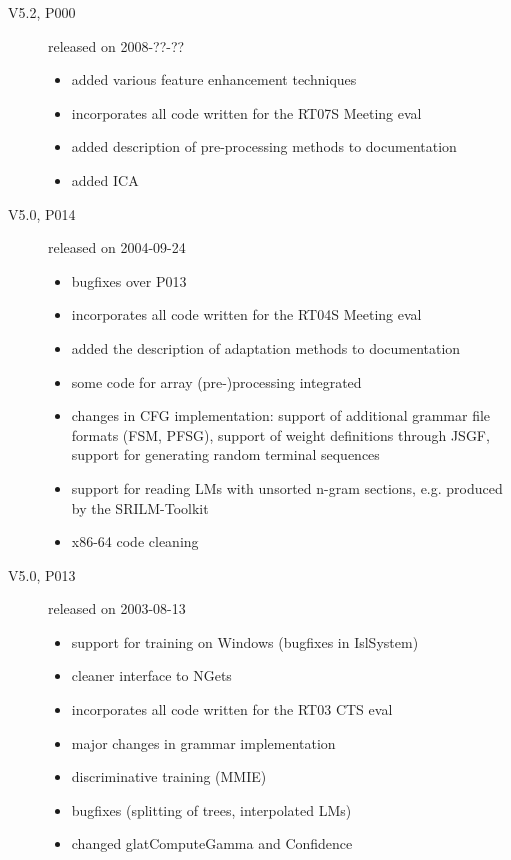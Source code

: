 \documentclass[a4paper,twoside]{book}
\begin{document}
\begin{description}

\item[V5.2, P000] released on 2008-??-??

  \begin{itemize}
  \item added various feature enhancement techniques 
  \item incorporates all code written for the RT07S Meeting eval
  \item added description of pre-processing methods to documentation
  \item added ICA
  \end{itemize}

\item[V5.0, P014] released on 2004-09-24

  \begin{itemize}
  \item bugfixes over P013
  \item incorporates all code written for the RT04S Meeting eval
  \item added the description of adaptation methods to documentation
  \item some code for array (pre-)processing integrated
  \item changes in CFG implementation: support of additional grammar
    file formats (FSM, PFSG), support of weight definitions through
    JSGF, support for generating random terminal sequences
  \item support for reading LMs with unsorted n-gram sections, e.g.
    produced by the SRILM-Toolkit
  \item x86-64 code cleaning
  \end{itemize}

\item[V5.0, P013] released on 2003-08-13

  \begin{itemize}
  \item support for training on Windows (bugfixes in IslSystem)
  \item cleaner interface to NGets
  \item incorporates all code written for the RT03 CTS eval
  \item major changes in grammar implementation
  \item discriminative training (MMIE)
  \item bugfixes (splitting of trees, interpolated LMs) 
  \item changed glatComputeGamma and Confidence
  \end{itemize}


\end{description}
\end{document}
